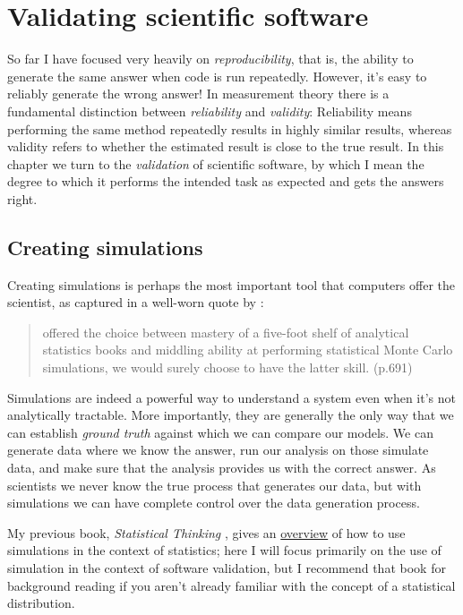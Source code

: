 \chapter{Validating scientific software}

So far I have focused very heavily on \textit{reproducibility}, that is, the ability to generate the same answer when code is run repeatedly.  However, it's easy to reliably generate the wrong answer!  In measurement theory there is a fundamental distinction between \textit{reliability} and \textit{validity}: Reliability means performing the same method repeatedly results in highly similar results, whereas validity refers to whether the estimated result is close to the true result.  In this chapter we turn to the \textit{validation} of scientific software, by which I mean the degree to which it performs the intended task as expected and gets the answers right.

\section{Creating simulations}

Creating simulations is perhaps the most important tool that computers offer the scientist, as captured in a well-worn quote by \citep{Press:1992}:

\begin{quote}
offered the choice between mastery of a five-foot shelf of analytical statistics books
and middling ability at performing statistical Monte Carlo simulations, we would surely
choose to have the latter skill. (p.691)
\end{quote}

Simulations are indeed a powerful way to understand a system even when it's not analytically tractable.  More importantly, they are generally the only way that we can establish \textit{ground truth} against which we can compare our models.  We can generate data where we know the answer, run our analysis on those simulate data, and make sure that the analysis provides us with the correct answer.  As scientists we never know the true process that generates our data, but with simulations we can have complete control over the data generation process.

My previous book, \textit{Statistical Thinking} \citep{Poldrack:2023stats}, gives an \href{https://statsthinking21.github.io/statsthinking21-core-site/resampling-and-simulation.html}{overview} of how to use simulations in the context of statistics; here I will focus primarily on the use of simulation in the context of software validation, but I recommend that book for background reading if you aren't already familiar with the concept of a statistical distribution.

